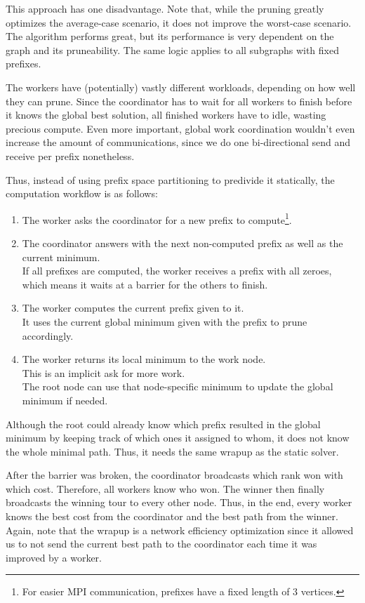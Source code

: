 This approach has one disadvantage. Note that, while the pruning greatly optimizes the average-case scenario, it does not improve the worst-case scenario. The algorithm performs great, but its performance is very dependent on the graph and its pruneability. The same logic applies to all subgraphs with fixed prefixes.

The workers have (potentially) vastly different workloads, depending on how well they can prune. Since the coordinator has to wait for all workers to finish before it knows the global best solution, all finished workers have to idle, wasting precious compute. Even more important, global work coordination wouldn't even increase the amount of communications, since we do one bi-directional send and receive per prefix nonetheless.

Thus, instead of using prefix space partitioning to predivide it statically, the computation workflow is as follows:
\begin{enumerate}
    \item The worker asks the coordinator for a new prefix to compute\footnote{For easier \ac{MPI} communication, prefixes have a fixed length of $3$ vertices.}.
\item The coordinator answers with the next non-computed prefix as well as the current minimum.\\
    If all prefixes are computed, the worker receives a prefix with all zeroes, which means it waits at a barrier for the others to finish.
\item The worker computes the current prefix given to it.\\
    It uses the current global minimum given with the prefix to prune accordingly.
\item The worker returns its local minimum to the work node.\\
    This is an implicit ask for more work.\\
    The root node can use that node-specific minimum to update the global minimum if needed.
\end{enumerate}

Although the root could already know which prefix resulted in the global minimum by keeping track of which ones it assigned to whom, it does not know the whole minimal path. Thus, it needs the same wrapup as the static solver.

After the barrier was broken, the coordinator broadcasts which rank won with which cost. Therefore, all workers know who won. The winner then finally broadcasts the winning tour to every other node. Thus, in the end, every worker knows the best cost from the coordinator and the best path from the winner. Again, note that the wrapup is a network efficiency optimization since it allowed us to not send the current best path to the coordinator each time it was improved by a worker.

